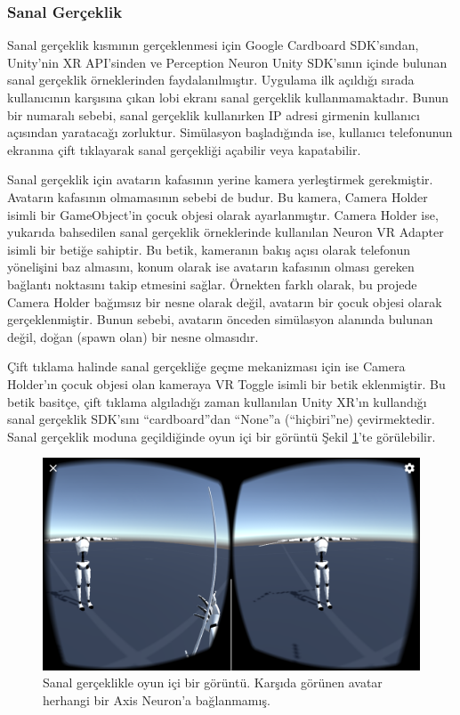 \documentclass[a4paper, 12pt, titlepage]{article}
\begin{document}
\vfill
\clearpage

\subsubsection{Sanal Gerçeklik}

Sanal gerçeklik kısmının gerçeklenmesi için Google Cardboard SDK’sından, Unity’nin XR API’sinden ve
Perception Neuron Unity SDK’sının içinde bulunan sanal gerçeklik örneklerinden faydalanılmıştır.
Uygulama ilk açıldığı sırada kullanıcının karşısına çıkan lobi ekranı sanal gerçeklik
kullanmamaktadır. Bunun bir numaralı sebebi, sanal gerçeklik kullanırken IP adresi girmenin
kullanıcı açısından yaratacağı zorluktur. Simülasyon başladığında ise, kullanıcı telefonunun
ekranına çift tıklayarak sanal gerçekliği açabilir veya kapatabilir.

Sanal gerçeklik için avatarın kafasının yerine kamera yerleştirmek gerekmiştir. Avatarın kafasının
olmamasının sebebi de budur. Bu kamera, Camera Holder isimli bir GameObject’in çocuk objesi olarak
ayarlanmıştır. Camera Holder ise, yukarıda bahsedilen sanal gerçeklik örneklerinde kullanılan
Neuron VR Adapter isimli bir betiğe sahiptir. Bu betik, kameranın bakış açısı olarak telefonun
yönelişini baz almasını, konum olarak ise avatarın kafasının olması gereken bağlantı noktasını
takip etmesini sağlar. Örnekten farklı olarak, bu projede Camera Holder bağımsız bir nesne olarak
değil, avatarın bir çocuk objesi olarak gerçeklenmiştir. Bunun sebebi, avatarın önceden simülasyon
alanında bulunan değil, doğan (spawn olan) bir nesne olmasıdır.

Çift tıklama halinde sanal gerçekliğe geçme mekanizması için ise Camera Holder’ın çocuk objesi olan
kameraya VR Toggle isimli bir betik eklenmiştir. Bu betik basitçe, çift tıklama algıladığı zaman
kullanılan Unity XR’ın kullandığı sanal gerçeklik SDK’sını “cardboard”dan “None”a (“hiçbiri”ne)
çevirmektedir. Sanal gerçeklik moduna geçildiğinde oyun içi bir görüntü Şekil \ref{vr}’te
görülebilir.

\begin{figure}[ht!]
    \centering
        \includegraphics[width=6in]{images/vr}
    \caption{Sanal gerçeklikle oyun içi bir görüntü. Karşıda görünen avatar herhangi bir Axis        
             Neuron'a bağlanmamış.}
    \label{vr}
\end{figure}
\end{document}

